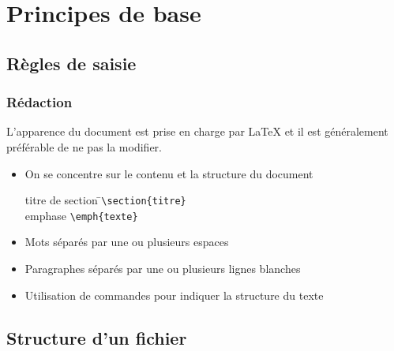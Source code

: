 \section{Principes de base}

\subsection{Règles de saisie}

\begin{frame}[fragile=singleslide]
  \frametitle{Rédaction}

  L'apparence du document est prise en charge par {\LaTeX} et
  il est généralement préférable de ne pas la modifier.

  \begin{itemize}
  \item On se concentre sur le \alert{contenu} et la \alert{structure} du
    document
      \bigskip
      \begin{tabbing}
        titre de section \qquad\= \faArrowRight \qquad\= \verb|\section{titre}| \\[6pt]
        emphase \> \faArrowRight \> \verb|\emph{texte}|
      \end{tabbing}
      \bigskip
  \item Mots séparés par une ou plusieurs \alert{espaces}
  \item Paragraphes séparés par une ou plusieurs \alert{lignes blanches}
  \item Utilisation de \alert{commandes} pour indiquer la structure du texte
  \end{itemize}
\end{frame}

\subsection{Structure d'un fichier}

